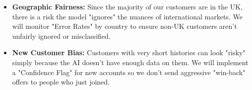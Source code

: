 \documentclass[11pt,a4paper]{article}
\begin{document}
\begin{itemize}
    \item \textbf{Geographic Fairness:} Since the majority of our customers are in the UK, there is a risk the model "ignores" the nuances of international markets. We will monitor "Error Rates" by country to ensure non-UK customers aren't unfairly ignored or misclassified.
    \item \textbf{New Customer Bias:} Customers with very short histories can look "risky" simply because the AI doesn't have enough data on them. We will implement a "Confidence Flag" for new accounts so we don't send aggressive "win-back" offers to people who just joined.
\end{itemize}
\end{document}
